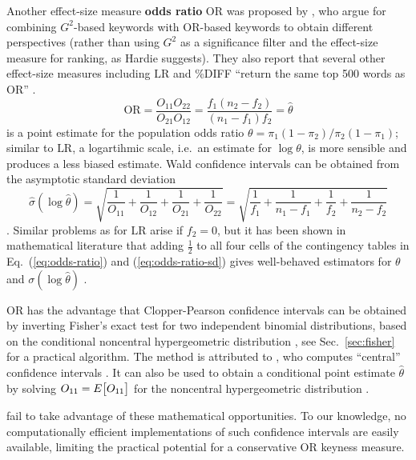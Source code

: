 \documentclass[a4paper]{article}
\newcommand{\LLR}{G^2}          %
\newcommand{\LR}{\text{LR}}     %
\newcommand{\OR}{\text{OR}}     %
\begin{document}
Another effect-size measure \textbf{odds ratio} $\OR$ was proposed by \citet{Pojanapunya:WatsonTodd:18}, who argue for combining $\LLR$-based keywords with $\OR$-based keywords to obtain different perspectives (rather than using $\LLR$ as a significance filter and the effect-size measure for ranking, as Hardie suggests).  They also report that several other effect-size measures including $\LR$ and \%DIFF ``return the same top 500 words as OR'' \citep[147]{Pojanapunya:WatsonTodd:18}.
\begin{equation}
  \label{eq:odds-ratio}
  \OR = \frac{O_{11} O_{22}}{O_{21} O_{12}}
  = \frac{f_1 (n_2 - f_2)}{(n_1 - f_1) f_2}
  = \hat{\theta}
\end{equation}
is a point estimate for the population odds ratio $\theta = \pi_1 (1 - \pi_2) / \pi_2 (1 - \pi_1)$; similar to $\LR$, a logartihmic scale, i.e.\ an estimate for $\log \theta$, is more sensible and produces a less biased estimate.  Wald confidence intervals can be obtained from the asymptotic standard deviation
\begin{equation}
  \label{eq:odds-ratio-sd}
  \hat{\sigma}(\log \hat{\theta}) = \sqrt{
    \frac{1}{O_{11}} + \frac{1}{O_{12}} + \frac{1}{O_{21}} + \frac{1}{O_{22}}
  } = \sqrt{
    \frac{1}{f_1} + \frac{1}{n_1 - f_1} + \frac{1}{f_2} + \frac{1}{n_2 - f_2}
  }
\end{equation}
\citep[71]{Agresti:02}.  Similar problems as for $\LR$ arise if $f_2 = 0$, but it has been shown in mathematical literature that adding $\frac12$ to all four cells of the contingency tables in Eq.~(\ref{eq:odds-ratio}) and (\ref{eq:odds-ratio-sd}) gives well-behaved estimators for $\theta$ and $\sigma(\log \hat{\theta})$ \citep[70f]{Agresti:02}.

$\OR$ has the advantage that Clopper-Pearson confidence intervals can be obtained by inverting Fisher's exact test for two independent binomial distributions, based on the conditional noncentral hypergeometric distribution \citep[99]{Agresti:02}, see Sec.~\ref{sec:fisher} for a practical algorithm. The method is attributed to \citet{Cornfield:56}, who computes ``central'' confidence intervals \citep[53]{Fay:10a}. It can also be used to obtain a conditional point estimate $\hat{\theta}$ by solving $O_{11} = E_{}\bigl[O_{11}\bigr]$ for the noncentral hypergeometric distribution \citep[100]{Agresti:02}.

\citet{Pojanapunya:WatsonTodd:18} fail to take advantage of these mathematical opportunities.  To our knowledge, no computationally efficient implementations of such confidence intervals are easily available, limiting the practical potential for a conservative $\OR$ keyness measure.
\end{document}
